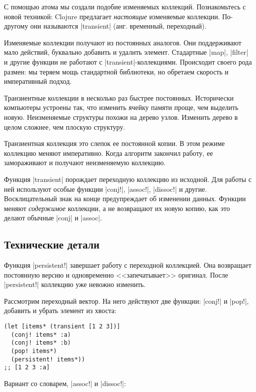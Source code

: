 С помощью атома мы создали подобие изменяемых коллекций. Познакомьтесь с новой
техникой: Clojure предлагает \emph{настоящие} изменяемые коллекции. По-другому
они называются \spverb|transient| (анг. временный, переходный).

Изменяемые коллекции получают из постоянных аналогов. Они поддерживают мало
действий, буквально добавить и удалить элемент. Стадартные \spverb|map|,
\spverb|filter| и другие функции не работают с
\spverb|transient|-коллекциями. Происходит своего рода размен: мы теряем мощь
стандартной библиотеки, но обретаем скорость и императивный подход.

Транзиентные коллекции в несколько раз быстрее постоянных. Исторически
компьютеры устроены так, что изменить ячейку памяти проще, чем выделить
новую. Неизменяемые структуры похожи на дерево узлов. Изменить дерево в целом
сложнее, чем плоскую структуру.

Транзиентная коллекция это слепок ее постоянной копии. В этом режиме коллекцию
меняют императивно. Когда алгоритм закончил работу, ее замораживают и получают
неизменяемую коллекцию.

Функция \spverb|transient| порождает переходную коллекцию из исходной. Для
работы с ней используют особые функции \spverb|conj!|, \spverb|assoc!|,
\spverb|dissoc!| и другие. Восклицательный знак на конце предупреждает об
изменении данных. Функции меняют \emph{содержимое} коллекции, а не возвращают их
новую копию, как это делают обычные \spverb|conj| и \spverb|assoc|.

\subsection{Технические детали}

Функция \spverb|persistent!| завершает работу с переходной коллекцией. Она
возвращает постоянную версию и одновременно <<запечатывает>> оригинал. После
\spverb|persistent!| коллекцию уже невожно изменить.

Рассмотрим переходный вектор. На него действуют две функции: \spverb|conj!| и
\spverb|pop!|, добавить и убрать элемент из хвоста:

\begin{verbatim}
(let [items* (transient [1 2 3])]
  (conj! items* :a)
  (conj! items* :b)
  (pop! items*)
  (persistent! items*))
;; [1 2 3 :a]
\end{verbatim}

\noindent
Вариант со словарем, \spverb|assoc!| и \spverb|dissoc!|:

